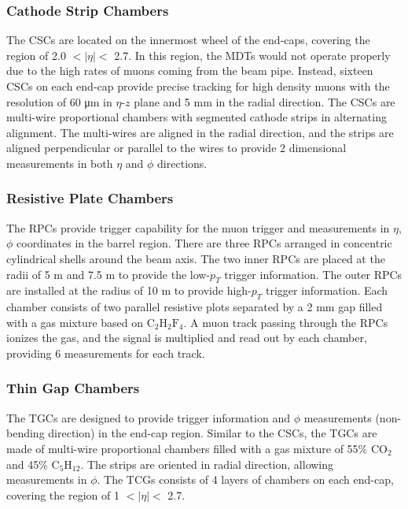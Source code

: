 \subsubsection{Cathode Strip Chambers}
\label{sec:atlas:csc}

The CSCs are located on the innermost wheel of the end-caps, covering the region of 2.0 $<|\eta|<$ 2.7. In this region, the MDTs would not operate properly due to the high rates of muons coming from the beam pipe. Instead, sixteen CSCs on each end-cap provide precise tracking for high density muons with the resolution of 60 \si{\micro\meter} in $\eta$-$z$ plane and 5 \si{\milli\meter} in the radial direction. The CSCs are multi-wire proportional chambers with segmented cathode strips in alternating alignment. The multi-wires are aligned in the radial direction, and the strips are aligned perpendicular or parallel to the wires to provide 2 dimensional measurements in both $\eta$ and $\phi$ directions.


\subsubsection{Resistive Plate Chambers}
\label{sec:atlas:rpc}

The RPCs provide trigger capability for the muon trigger and measurements in $\eta$, $\phi$ coordinates in the barrel region. There are three RPCs arranged in concentric cylindrical shells around the beam axis. The two inner RPCs are placed at the radii of 5 \si{\meter} and 7.5 \si{\meter} to provide the low-$p_{T}$ trigger information. The outer RPCs are installed at the radius of 10 \si{\meter} to provide high-$p_{T}$ trigger information. Each chamber consists of two parallel resistive plots separated by a 2 \si{\milli\meter} gap filled with a gas mixture based on $\mathrm{C}_{2}\mathrm{H}_{2}\mathrm{F}_{4}$. A muon track passing through the RPCs ionizes the gas, and the signal is multiplied and read out by each chamber, providing 6 measurements for each track.

\subsubsection{Thin Gap Chambers}
\label{sec:atlas:tgc}

The TGCs are designed to provide trigger information and $\phi$ measurements (non-bending direction) in the end-cap region. Similar to the CSCs, the TGCs are made of multi-wire proportional chambers filled with a gas mixture of 55\% $\mathrm{CO}_{2}$ and 45\% $\mathrm{C}_{5}\mathrm{H}_{12}$. The strips are oriented in radial direction, allowing measurements in $\phi$. The TCGs consists of 4 layers of chambers on each end-cap, covering the region of 1 $<|\eta|<$ 2.7.


